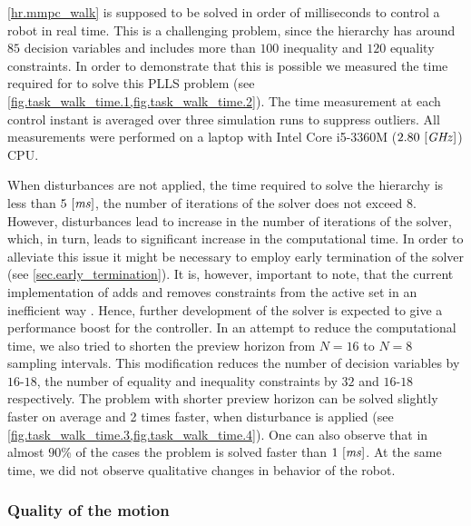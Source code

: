 \cref{hr.mmpc_walk} is supposed to be solved in order of milliseconds to
control a robot in real time. This is a challenging problem, since the
hierarchy has around $85$ decision variables and includes more than $100$
inequality and $120$ equality constraints. In order to demonstrate that this is
possible we measured the time required for  to solve this \ac{PLLS}
problem (see \cref{fig.task_walk_time.1,fig.task_walk_time.2}). The time
measurement at each control instant is averaged over three simulation runs to
suppress outliers. All measurements were performed on a laptop with Intel Core
i5-3360M ($2.80~[\mathit{GHz}]$) \acs{CPU}.


When disturbances are not applied, the time required to solve the hierarchy is
less than $5~[\mathit{ms}]$, the number of iterations of the solver does not exceed
$8$. However, disturbances lead to increase in the number of iterations of the
solver, which, in turn, leads to significant increase in the computational
time. In order to alleviate this issue it might be necessary to employ early
termination of the solver (see \cref{sec.early_termination}). It is, however,
important to note, that the current implementation of  adds and
removes constraints from the active set in an inefficient way
\cite{Dimitrov2015preprint}. Hence, further development of the solver is
expected to give a performance boost for the controller. In an attempt to
reduce the computational time, we also tried to shorten the preview horizon
from $N = 16$ to $N = 8$ sampling intervals. This modification reduces the
number of decision variables by $16$-$18$, the number of equality and
inequality constraints by $32$ and $16$-$18$ respectively. The problem with
shorter preview horizon can be solved slightly faster on average and 2 times
faster, when disturbance is applied (see
\cref{fig.task_walk_time.3,fig.task_walk_time.4}). One can also observe that in
almost $90$\% of the cases the problem is solved faster than $1~[\mathit{ms}]$. At
the same time, we did not observe qualitative changes in behavior of the robot.



\subsubsection{Quality of the motion}\label{sec.motion_quality}


